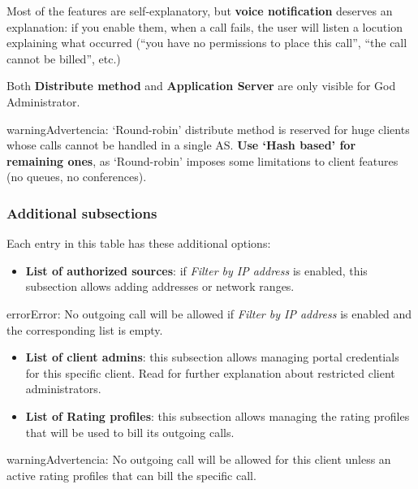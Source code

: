 \documentclass[letterpaper,10pt,spanish]{sphinxmanual}
\begin{document}
Most of the features are self-explanatory, but \textbf{voice notification} deserves
an explanation: if you enable them, when a call fails, the user will listen a
locution explaining what occurred (``you have no permissions to place this call'',
``the call cannot be billed'', etc.)

Both \textbf{Distribute method} and \textbf{Application Server} are only visible for God
Administrator.

\begin{notice}{warning}{Advertencia:}
`Round-robin' distribute method is reserved for huge clients
whose calls cannot be handled in a single AS. \textbf{Use `Hash based'
for remaining ones}, as `Round-robin' imposes some limitations
to client features (no queues, no conferences).
\end{notice}


\subsubsection{Additional subsections}
\label{administration_portal/brand/clients/virtual_pbx:additional-subsections}
Each entry in this table has these additional options:
\begin{itemize}
\item {} 
\textbf{List of authorized sources}: if \emph{Filter by IP address} is enabled, this subsection allows adding addresses or network ranges.

\end{itemize}

\begin{notice}{error}{Error:}
No outgoing call will be allowed if \emph{Filter by IP address} is enabled and the corresponding list is empty.
\end{notice}
\begin{itemize}
\item {} 
\textbf{List of client admins}: this subsection allows managing portal credentials for this specific client. Read {\hyperref[api_rest/acls:acls]{}}
for further explanation about restricted client administrators.

\item {} 
\textbf{List of Rating profiles}: this subsection allows managing the rating profiles that will be used to bill its outgoing calls.

\end{itemize}

\begin{notice}{warning}{Advertencia:}
No outgoing call will be allowed for this client unless an active rating profiles that can
bill the specific call.
\end{notice}
\end{document}
